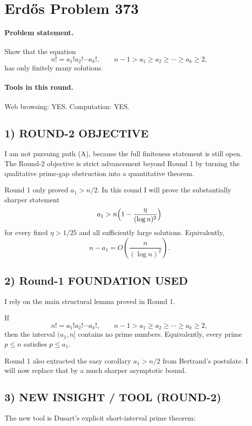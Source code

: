 \section{Erd\H{o}s Problem 373}

\paragraph{Problem statement.}
Show that the equation
\[
n! = a_{1}!a_{2}!\cdots a_{k}!,
\qquad
n-1>a_{1}\geq a_{2}\geq \cdots \geq a_{k}\geq 2,
\]
has only finitely many solutions.

\paragraph{Tools in this round.}
Web browsing: YES. Computation: YES.

\subsection*{1) ROUND-2 OBJECTIVE}
I am not pursuing path (A), because the full finiteness statement is still open. The Round-2 objective is strict advancement beyond Round 1 by turning the qualitative prime-gap obstruction into a quantitative theorem.

Round 1 only proved $a_{1}>n/2$. In this round I will prove the substantially sharper statement
\[
a_{1}>n\Bigl(1-\frac{\eta}{(\log n)^{2}}\Bigr)
\]
for every fixed $\eta>1/25$ and all sufficiently large solutions. Equivalently,
\[
n-a_{1}=O\!\left(\frac{n}{(\log n)^{2}}\right).
\]

\subsection*{2) Round-1 FOUNDATION USED}
I rely on the main structural lemma proved in Round 1.

If
\[
n! = a_{1}!a_{2}!\cdots a_{k}!,
\qquad
n-1>a_{1}\geq a_{2}\geq \cdots \geq a_{k}\geq 2,
\]
then the interval $(a_{1},n]$ contains no prime numbers. Equivalently, every prime $p\leq n$ satisfies $p\leq a_{1}$.

Round 1 also extracted the easy corollary $a_{1}>n/2$ from Bertrand's postulate. I will now replace that by a much sharper asymptotic bound.

\subsection*{3) NEW INSIGHT / TOOL (ROUND-2)}
The new tool is Dusart's explicit short-interval prime theorem:


